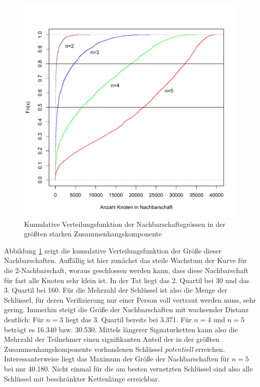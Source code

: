 \begin{figure}[th!]
  \centering
  \includegraphics[scale=0.6]{images/neighbourhood-cdf.pdf}
  \caption{Kumulative Verteilungsfunktion der Nachbarschaftsgrössen
    in der größten starken Zusammenhangskomponente}
  \label{fig:neighbourhood-cdf}
\end{figure}

Abbildung \ref{fig:neighbourhood-cdf} zeigt die kumulative
Verteilungsfunktion der Größe dieser Nachbarschaften. Auffällig
ist hier zunächst das steile Wachstum der Kurve für die
2-Nachbarschaft, woraus geschlossen werden kann, dass diese
Nachbarschaft für fast alle Knoten sehr klein ist. In der Tat liegt
das 2. Quartil bei 30 und das 3. Quartil bei 160. Für die Mehrzahl
der Schlüssel ist also die Menge der Schlüssel, für deren
Verifizierung nur einer Person voll vertraut werden muss, sehr
gering. Immerhin steigt die Größe der Nachbarschaften mit
wachsender Distanz deutlich: Für $n=3$ liegt das 3. Quartil bereits
bei 3.371. Für $n=4$ und $n=5$ beträgt es 16.340 bzw. 30.530. Mittels
längerer Signaturketten kann also die Mehrzahl der Teilnehmer einen
signifikanten Anteil der in der größten Zusammenhangskomponente
vorhandenen Schlüssel \emph{potentiell}
erreichen. Interessanterweise liegt das Maximum der
Größe der Nachbarschaften für $n=5$ bei nur 40.180. Nicht einmal für
die am besten vernetzten Schlüssel sind also alle Schlüssel mit
beschränkter Kettenlänge erreichbar.

